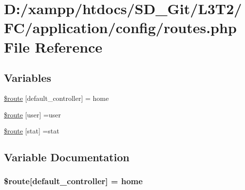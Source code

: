 \hypertarget{application_2config_2routes_8php}{}\section{D\+:/xampp/htdocs/\+S\+D\+\_\+\+Git/\+L3\+T2/\+F\+C/application/config/routes.php File Reference}
\label{application_2config_2routes_8php}
\subsection*{Variables}
\begin{DoxyCompactItemize}
\item 
\hyperlink{application_2config_2routes_8php_a6c2a82e4cec825eb1921141d08af834b}{\$route} \mbox{[}\textquotesingle{}default\+\_\+controller\textquotesingle{}\mbox{]} = \textquotesingle{}home\textquotesingle{}
\item 
\hyperlink{application_2config_2routes_8php_aa8496714b32f3c34d6f32113ad7927de}{\$route} \mbox{[}\textquotesingle{}user\textquotesingle{}\mbox{]} =\textquotesingle{}user\textquotesingle{}
\item 
\hyperlink{application_2config_2routes_8php_a209acc2bed9bf0fe6f3eae47655889d3}{\$route} \mbox{[}\textquotesingle{}stat\textquotesingle{}\mbox{]} =\textquotesingle{}stat\textquotesingle{}
\end{DoxyCompactItemize}


\subsection{Variable Documentation}
\hypertarget{application_2config_2routes_8php_a6c2a82e4cec825eb1921141d08af834b}{}
\subsubsection[{\$route}]{\setlength{\rightskip}{0pt plus 5cm}\$route\mbox{[}\textquotesingle{}default\+\_\+controller\textquotesingle{}\mbox{]} = \textquotesingle{}home\textquotesingle{}}\label{application_2config_2routes_8php_a6c2a82e4cec825eb1921141d08af834b}
\hypertarget{application_2config_2routes_8php_aa8496714b32f3c34d6f32113ad7927de}{}
